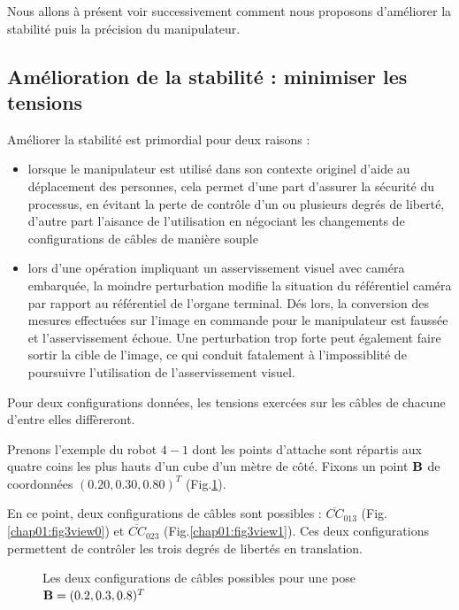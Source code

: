 Nous allons \`a pr\'esent voir successivement comment nous proposons 
d'am\'eliorer la stabilit\'e puis la pr\'ecision du manipulateur.
 

\subsection{Am\'elioration de la stabilit\'e : minimiser les tensions}

Am\'eliorer la stabilit\'e est primordial pour deux raisons :
\begin{itemize}
 \item lorsque le manipulateur est utilis\'e dans son contexte originel d'aide 
au d\'eplacement des personnes, cela permet d'une part d'assurer la 
s\'ecurit\'e du processus, en \'evitant la perte de contr\^ole d'un ou 
plusieurs degr\'es de libert\'e, d'autre part l'aisance de l'utilisation en 
n\'egociant les changements de configurations de c\^ables de mani\`ere souple
\item lors d'une op\'eration impliquant un asservissement visuel avec cam\'era 
embarqu\'ee, la moindre perturbation modifie la situation du r\'ef\'erentiel 
cam\'era par rapport au r\'ef\'erentiel de l'organe terminal. D\'es lors, la 
conversion des mesures effectu\'ees sur l'image en commande pour le 
manipulateur est fauss\'ee et l'asservissement \'echoue. Une perturbation trop 
forte peut \'egalement faire sortir la cible de l'image, ce qui conduit 
fatalement \`a l'impossiblit\'e de poursuivre l'utilisation de l'asservissement 
visuel.
\end{itemize} 

Pour deux configurations donn\'ees, les tensions exerc\'ees sur les c\^ables de 
chacune d'entre elles diff\`ereront.

Prenons l'exemple du robot $4-1$ dont les points d'attache sont r\'epartis aux 
quatre coins les plus hauts d'un cube d'un m\`etre de c\^ot\'e. Fixons un point 
${\bf B}$ de coordonn\'ees $(0.20, 0.30, 0.80)^T$ (Fig.\ref{chap01:fig3}).

En ce point, deux configurations de c\^ables sont possibles : 
$\overline{CC}_{013}$ (Fig.\ref{chap01:fig3view0}) et 
$\overline{CC}_{023}$ (Fig.\ref{chap01:fig3view1}). Ces deux configurations 
permettent de contr\^oler les trois degr\'es de libert\'es en translation.

\begin{figure}[htp]
  \centering
  \hfill
    \caption{\footnotesize{Les deux configurations de c\^ables possibles pour 
une pose ${\bf B} = (0.2, 0.3, 0.8)^T$}}
\label{chap01:fig3}
\end{figure}

